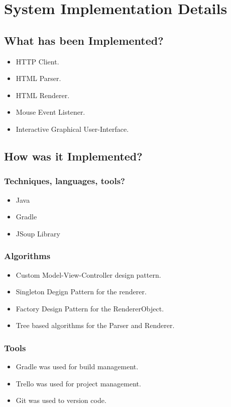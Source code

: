\documentclass[11pt]{article}
\begin{document}
\section{System Implementation Details}
\label{sec-2}
\subsection{What has been Implemented?}
\label{sec-2-1}
\begin{itemize}
\item HTTP Client.
\item HTML Parser.
\item HTML Renderer.
\item Mouse Event Listener.
\item Interactive Graphical User-Interface.
\end{itemize}

\subsection{How was it Implemented?}
\label{sec-2-2}
\subsubsection{Techniques, languages, tools?}
\label{sec-2-2-1}
\begin{itemize}
\item Java
\item Gradle
\item JSoup Library
\end{itemize}

\subsubsection{Algorithms}
\label{sec-2-2-2}
\begin{itemize}
\item Custom Model-View-Controller design pattern.
\item Singleton Degign Pattern for the renderer.
\item Factory Design Pattern for the RendererObject.
\item Tree based algorithms for the Parser and Renderer.
\end{itemize}

\subsubsection{Tools}
\label{sec-2-2-3}
\begin{itemize}
\item Gradle was used for build management.
\item Trello was used for project management.
\item Git was used to version code.
\end{itemize}
\end{document}
